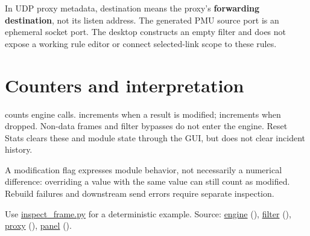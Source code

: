 In UDP proxy metadata, destination means the proxy's \textbf{forwarding destination}, not its listen address. The generated PMU source port is an ephemeral socket port. The desktop constructs an empty filter and does not expose a working rule editor or connect selected-link scope to these rules.

\section*{Counters and interpretation}
 counts engine calls.  increments when a result is modified;  increments when dropped. Non-data frames and filter bypasses do not enter the engine. Reset Stats clears these and module state through the GUI, but does not clear incident history.

A modification flag expresses module behavior, not necessarily a numerical difference: overriding a value with the same value can still count as modified. Rebuild failures and downstream send errors require separate inspection.

Use \hyperref[reference-files]{inspect\_frame.py} for a deterministic example. Source: \href{https://github.com/neerajjayesh/GridSec-project/blob/main/core/attack_engine.py}{engine} (), \href{https://github.com/neerajjayesh/GridSec-project/blob/main/core/traffic_filter.py}{filter} (), \href{https://github.com/neerajjayesh/GridSec-project/blob/main/core/pdc_proxy.py}{proxy} (), \href{https://github.com/neerajjayesh/GridSec-project/blob/main/gui/attack_panel.py}{panel} ().

